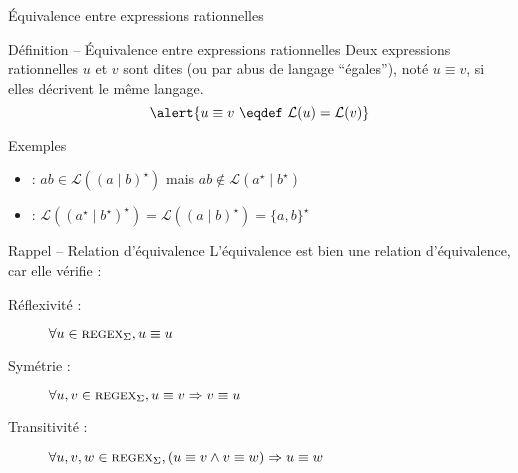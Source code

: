 
\begingroup

\begin{frame}{Équivalence entre expressions rationnelles}

  \begin{block}{Définition -- Équivalence entre expressions rationnelles}
    Deux expressions rationnelles \alert{$u$} et \alert{$v$} sont dites 
    (ou par abus de langage ``égales''), noté \alert{$u \equiv v$},
    si elles décrivent le même langage.
    $$\alert{u \equiv v ~\eqdef~ \mathcal{L}(u) = \mathcal{L}(v)}$$
  \end{block}

  \vspace{-2mm}
  \begin{exampleblock}{Exemples}
    \begin{itemize}
    \item {} : $ab \in \mathcal{L}((a \mid b)^\star)$ mais $ab \not\in \mathcal{L}(a^\star \mid  b^\star)$
    \item {} : $\mathcal{L}((a^\star \mid b^\star)^\star) = \mathcal{L}((a \mid b)^\star) = \{a, b\}^\star$
    \end{itemize}
  \end{exampleblock}

  \begin{block}{Rappel -- Relation d'équivalence}
    L'équivalence est bien une relation d'équivalence, car elle vérifie :
    \begin{description}
    \item[Réflexivité :] $\forall u\in\textsc{regex}_\Sigma, u\equiv u$
    \item[Symétrie :]    $\forall u, v\in\textsc{regex}_\Sigma, u\equiv v \Rightarrow v\equiv u$
    \item[Transitivité :]$\forall u, v, w\in\textsc{regex}_\Sigma, (u\equiv v \land v \equiv w) \Rightarrow u\equiv w$
    \end{description}
  \end{block}
  
\end{frame}

\endgroup
